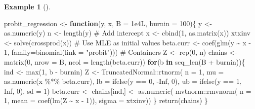 \documentclass[
  11pt,
  letterpaper,
]{scrbook}
\newenvironment{Shaded}{\begin{snugshade}}{\end{snugshade}}
\newcommand{\AttributeTok}[1]{\textcolor[rgb]{0.40,0.45,0.13}{#1}}
\newcommand{\CommentTok}[1]{\textcolor[rgb]{0.37,0.37,0.37}{#1}}
\newcommand{\ConstantTok}[1]{\textcolor[rgb]{0.56,0.35,0.01}{#1}}
\newcommand{\ControlFlowTok}[1]{\textcolor[rgb]{0.00,0.23,0.31}{\textbf{#1}}}
\newcommand{\DecValTok}[1]{\textcolor[rgb]{0.68,0.00,0.00}{#1}}
\newcommand{\FloatTok}[1]{\textcolor[rgb]{0.68,0.00,0.00}{#1}}
\newcommand{\FunctionTok}[1]{\textcolor[rgb]{0.28,0.35,0.67}{#1}}
\newcommand{\NormalTok}[1]{\textcolor[rgb]{0.00,0.23,0.31}{#1}}
\newcommand{\OtherTok}[1]{\textcolor[rgb]{0.00,0.23,0.31}{#1}}
\newcommand{\SpecialCharTok}[1]{\textcolor[rgb]{0.37,0.37,0.37}{#1}}
\newcommand{\StringTok}[1]{\textcolor[rgb]{0.13,0.47,0.30}{#1}}
\theoremstyle{definition}
\theoremstyle{plain}
\theoremstyle{plain}
\theoremstyle{definition}
\newtheorem{example}{Example}[chapter]
\theoremstyle{definition}
\theoremstyle{remark}
\begin{document}
\begin{example}[]
\begin{Shaded}
\begin{Highlighting}[]
\NormalTok{probit\_regression }\OtherTok{\textless{}{-}} \ControlFlowTok{function}\NormalTok{(y, x, }\AttributeTok{B =} \FloatTok{1e4}\NormalTok{L, }\AttributeTok{burnin =} \DecValTok{100}\NormalTok{)\{}
\NormalTok{  y }\OtherTok{\textless{}{-}} \FunctionTok{as.numeric}\NormalTok{(y)}
\NormalTok{  n }\OtherTok{\textless{}{-}} \FunctionTok{length}\NormalTok{(y)}
  \CommentTok{\# Add intercept}
\NormalTok{  x }\OtherTok{\textless{}{-}} \FunctionTok{cbind}\NormalTok{(}\DecValTok{1}\NormalTok{, }\FunctionTok{as.matrix}\NormalTok{(x))}
\NormalTok{  xtxinv }\OtherTok{\textless{}{-}} \FunctionTok{solve}\NormalTok{(}\FunctionTok{crossprod}\NormalTok{(x))}
  \CommentTok{\# Use MLE as initial values}
\NormalTok{  beta.curr }\OtherTok{\textless{}{-}} \FunctionTok{coef}\NormalTok{(}\FunctionTok{glm}\NormalTok{(y }\SpecialCharTok{\textasciitilde{}}\NormalTok{ x }\SpecialCharTok{{-}} \DecValTok{1}\NormalTok{, }\AttributeTok{family=}\FunctionTok{binomial}\NormalTok{(}\AttributeTok{link =} \StringTok{"probit"}\NormalTok{)))}
  \CommentTok{\# Containers}
\NormalTok{  Z }\OtherTok{\textless{}{-}} \FunctionTok{rep}\NormalTok{(}\DecValTok{0}\NormalTok{, n)}
\NormalTok{  chains }\OtherTok{\textless{}{-}} \FunctionTok{matrix}\NormalTok{(}\DecValTok{0}\NormalTok{, }\AttributeTok{nrow =}\NormalTok{ B, }\AttributeTok{ncol =} \FunctionTok{length}\NormalTok{(beta.curr))}
  \ControlFlowTok{for}\NormalTok{(b }\ControlFlowTok{in} \FunctionTok{seq\_len}\NormalTok{(B }\SpecialCharTok{+}\NormalTok{ burnin))\{}
\NormalTok{    ind }\OtherTok{\textless{}{-}} \FunctionTok{max}\NormalTok{(}\DecValTok{1}\NormalTok{, b }\SpecialCharTok{{-}}\NormalTok{ burnin)}
\NormalTok{    Z }\OtherTok{\textless{}{-}}\NormalTok{ TruncatedNormal}\SpecialCharTok{::}\FunctionTok{rtnorm}\NormalTok{(}
      \AttributeTok{n =} \DecValTok{1}\NormalTok{,}
      \AttributeTok{mu =} \FunctionTok{as.numeric}\NormalTok{(x }\SpecialCharTok{\%*\%}\NormalTok{ beta.curr),}
      \AttributeTok{lb =} \FunctionTok{ifelse}\NormalTok{(y }\SpecialCharTok{==} \DecValTok{0}\NormalTok{, }\SpecialCharTok{{-}}\ConstantTok{Inf}\NormalTok{, }\DecValTok{0}\NormalTok{),}
      \AttributeTok{ub =} \FunctionTok{ifelse}\NormalTok{(y }\SpecialCharTok{==} \DecValTok{1}\NormalTok{, }\ConstantTok{Inf}\NormalTok{, }\DecValTok{0}\NormalTok{),}
      \AttributeTok{sd =} \DecValTok{1}\NormalTok{)}
\NormalTok{    beta.curr }\OtherTok{\textless{}{-}}\NormalTok{ chains[ind,] }\OtherTok{\textless{}{-}} \FunctionTok{as.numeric}\NormalTok{(}
\NormalTok{      mvtnorm}\SpecialCharTok{::}\FunctionTok{rmvnorm}\NormalTok{(}
        \AttributeTok{n =} \DecValTok{1}\NormalTok{, }
        \AttributeTok{mean =} \FunctionTok{coef}\NormalTok{(}\FunctionTok{lm}\NormalTok{(Z }\SpecialCharTok{\textasciitilde{}}\NormalTok{ x }\SpecialCharTok{{-}} \DecValTok{1}\NormalTok{)),}
        \AttributeTok{sigma =}\NormalTok{ xtxinv))}
\NormalTok{  \}}
\FunctionTok{return}\NormalTok{(chains)}
\NormalTok{\}}
\end{Highlighting}
\end{Shaded}

\end{example}
\end{document}
